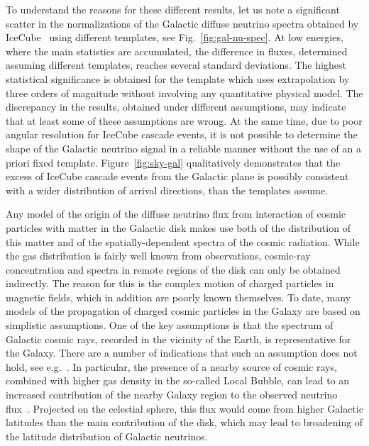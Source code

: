 \documentclass[a4paper,noshowpacs,noshowkeys,floatfix,twocolumn,preprintnumbers,nofootinbib]{revtex4-2}
\begin{document}
To understand the reasons for these different results, let us note a significant scatter in the normalizations of the  Galactic diffuse neutrino spectra obtained by IceCube~\cite{IceCube-gal-Science} using different templates, see Fig.~\ref{fig:gal-nu-spec}. At low energies, where the main statistics are accumulated, the difference in fluxes, determined assuming different templates, reaches several standard deviations. The highest statistical significance is obtained for the template which uses extrapolation by three orders of magnitude without involving any quantitative physical model. The discrepancy in the results, obtained under different assumptions, may indicate that at least some of these assumptions are wrong. At the same time, due to poor angular resolution for IceCube cascade events, it is not possible to determine the shape of the Galactic neutrino signal in a reliable manner without the use of an a priori fixed template. Figure~\ref{fig:sky-gal} qualitatively demonstrates that the excess of IceCube cascade events from the Galactic plane is possibly consistent with a wider distribution of arrival directions, than the templates assume.

Any model of the origin of the diffuse neutrino flux from interaction of cosmic particles with matter in the Galactic disk makes use both of the distribution of this matter and of the spatially-dependent spectra of the cosmic radiation. While the gas distribution is fairly well known from observations, cosmic-ray concentration and spectra in remote regions of the disk can only be obtained indirectly. The reason for this is the complex motion of charged particles in magnetic fields, which in addition are poorly known themselves. To date, many models of the propagation of charged cosmic particles in the Galaxy are based on simplistic assumptions. One of the key assumptions is that the spectrum of Galactic cosmic rays, recorded in the vicinity of the Earth, is representative for the Galaxy. There are a number of indications that such an assumption does not hold, see e.g.\ \cite{Semikoz-bubble1, Semikoz-slope1, GiacintiSemikoz2023,Semikoz-ANTARESgal}. In particular, the presence of a nearby source of cosmic rays, combined with higher gas density in the so-called Local Bubble, can lead to an increased contribution of the nearby Galaxy region to the observed neutrino flux~\cite{Semikoz-bubble1, Semikoz-bubble2}. Projected on the celestial sphere, this flux would come from higher Galactic latitudes than the main contribution of the disk, which may lead to broadening of the latitude distribution of Galactic neutrinos.
\end{document}
